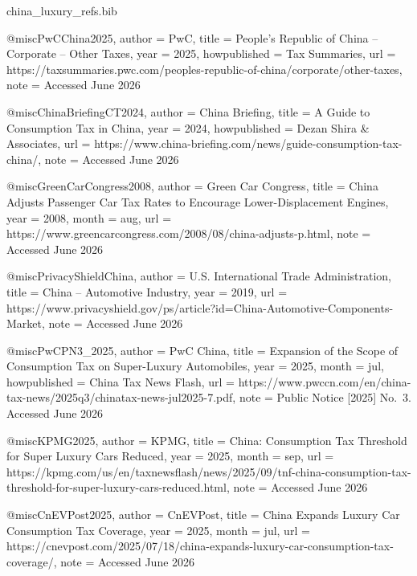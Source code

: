 \begin{filecontents}{china_luxury_refs.bib}

@misc{PwCChina2025,
  author       = {{PwC}},
  title        = {People's Republic of China -- Corporate -- Other Taxes},
  year         = {2025},
  howpublished = {Tax Summaries},
  url          = {https://taxsummaries.pwc.com/peoples-republic-of-china/corporate/other-taxes},
  note         = {Accessed June 2026}
}

@misc{ChinaBriefingCT2024,
  author       = {{China Briefing}},
  title        = {A Guide to Consumption Tax in China},
  year         = {2024},
  howpublished = {Dezan Shira \& Associates},
  url          = {https://www.china-briefing.com/news/guide-consumption-tax-china/},
  note         = {Accessed June 2026}
}

@misc{GreenCarCongress2008,
  author       = {{Green Car Congress}},
  title        = {China Adjusts Passenger Car Tax Rates to Encourage Lower-Displacement Engines},
  year         = {2008},
  month        = aug,
  url          = {https://www.greencarcongress.com/2008/08/china-adjusts-p.html},
  note         = {Accessed June 2026}
}

@misc{PrivacyShieldChina,
  author       = {{U.S. International Trade Administration}},
  title        = {China -- Automotive Industry},
  year         = {2019},
  url          = {https://www.privacyshield.gov/ps/article?id=China-Automotive-Components-Market},
  note         = {Accessed June 2026}
}

@misc{PwCPN3_2025,
  author       = {{PwC China}},
  title        = {Expansion of the Scope of Consumption Tax on Super-Luxury Automobiles},
  year         = {2025},
  month        = jul,
  howpublished = {China Tax News Flash},
  url          = {https://www.pwccn.com/en/china-tax-news/2025q3/chinatax-news-jul2025-7.pdf},
  note         = {Public Notice [2025] No.~3. Accessed June 2026}
}

@misc{KPMG2025,
  author       = {{KPMG}},
  title        = {China: Consumption Tax Threshold for Super Luxury Cars Reduced},
  year         = {2025},
  month        = sep,
  url          = {https://kpmg.com/us/en/taxnewsflash/news/2025/09/tnf-china-consumption-tax-threshold-for-super-luxury-cars-reduced.html},
  note         = {Accessed June 2026}
}

@misc{CnEVPost2025,
  author       = {{CnEVPost}},
  title        = {China Expands Luxury Car Consumption Tax Coverage},
  year         = {2025},
  month        = jul,
  url          = {https://cnevpost.com/2025/07/18/china-expands-luxury-car-consumption-tax-coverage/},
  note         = {Accessed June 2026}
}


\end{filecontents}
